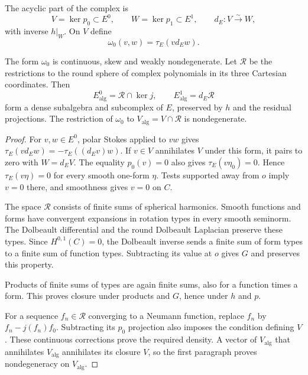 The acyclic part of the complex is
\[
 V=\ker p_0\subset E^0,\qquad W=\ker p_1\subset E^1,
 \qquad d_E:V\xrightarrow{\sim}W,
\]
with inverse $h|_W$. On $V$ define
\begin{equation}\label{mht:eq:acyclic-symplectic-form}
 \omega_0(v,w)=\tau_E(vd_Ew).
\end{equation}

\begin{lemma}\label{mht:lem:finite-symplectic}
The form $\omega_0$ is continuous, skew and weakly nondegenerate.
Let $\mathcal R$ be the restrictions to the round sphere of complex
polynomials in its three Cartesian coordinates. Then
\[
 E_{\mathrm{alg}}^0=\mathcal R\cap\ker j,
 \qquad E_{\mathrm{alg}}^1=d_E\mathcal R
\]
form a dense subalgebra and subcomplex of $E$, preserved by $h$ and
the residual projections. The restriction of $\omega_0$ to
$V_{\mathrm{alg}}=V\cap\mathcal R$ is nondegenerate.
\end{lemma}

\begin{proof}
For $v,w\in E^0$, polar Stokes applied to $vw$ gives
$\tau_E(vd_Ew)=-\tau_E((d_Ev)w)$. If $v\in V$ annihilates
$V$ under this form, it pairs to zero with $W=d_EV$. The equality
$p_0(v)=0$ also gives $\tau_E(v\eta_0)=0$. Hence
$\tau_E(v\eta)=0$ for every smooth one-form $\eta$. Tests supported
away from $o$ imply $v=0$ there, and smoothness gives $v=0$ on $C$.

The space $\mathcal R$ consists of finite sums of spherical
harmonics. Smooth functions and forms have convergent expansions in
rotation types in every smooth seminorm. The Dolbeault differential
and the round Dolbeault Laplacian preserve these types. Since
$H^{0,1}(C)=0$, the Dolbeault inverse sends a finite sum of form
types to a finite sum of function types. Subtracting its value at
$o$ gives $G$ and preserves this property.

Products of finite sums
of types are again finite sums, also for a function times a form.
This proves closure under products and $G$, hence under $h$ and $p$.

For a sequence $f_n\in\mathcal R$ converging to a Neumann function,
replace $f_n$ by $f_n-j(f_n)f_0$. Subtracting its $p_0$ projection
also imposes the condition defining $V$. These continuous corrections
prove the required density. A vector of $V_{\mathrm{alg}}$ that
annihilates $V_{\mathrm{alg}}$ annihilates its closure $V$, so the
first paragraph proves nondegeneracy on $V_{\mathrm{alg}}$.
\end{proof}

